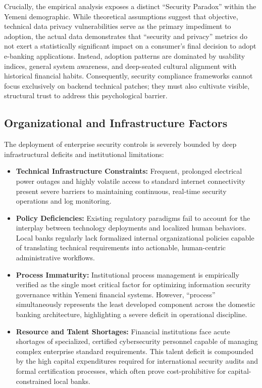\documentclass[12pt,a4paper,oneside]{report}
\begin{document}
	Crucially, the empirical analysis exposes a distinct ``Security Paradox'' within the Yemeni demographic. While theoretical assumptions suggest that objective, technical data privacy vulnerabilities serve as the primary impediment to adoption, the actual data demonstrates that ``security and privacy'' metrics do not exert a statistically significant impact on a consumer’s final decision to adopt e-banking applications. Instead, adoption patterns are dominated by usability indices, general system awareness, and deep-seated cultural alignment with historical financial habits. Consequently, security compliance frameworks cannot focus exclusively on backend technical patches; they must also cultivate visible, structural trust to address this psychological barrier.
	
	\subsection{Organizational and Infrastructure Factors}
	The deployment of enterprise security controls is severely bounded by deep infrastructural deficits and institutional limitations:
	\begin{itemize}
		\item \textbf{Technical Infrastructure Constraints:} Frequent, prolonged electrical power outages and highly volatile access to standard internet connectivity present severe barriers to maintaining continuous, real-time security operations and log monitoring.
		\item \textbf{Policy Deficiencies:} Existing regulatory paradigms fail to account for the interplay between technology deployments and localized human behaviors. Local banks regularly lack formalized internal organizational policies capable of translating technical requirements into actionable, human-centric administrative workflows.
		\item \textbf{Process Immaturity:} Institutional process management is empirically verified as the single most critical factor for optimizing information security governance within Yemeni financial systems. However, ``process'' simultaneously represents the least developed component across the domestic banking architecture, highlighting a severe deficit in operational discipline.
		\item \textbf{Resource and Talent Shortages:} Financial institutions face acute shortages of specialized, certified cybersecurity personnel capable of managing complex enterprise standard requirements. This talent deficit is compounded by the high capital expenditures required for international security audits and formal certification processes, which often prove cost-prohibitive for capital-constrained local banks.
	\end{itemize}
	
\end{document}
